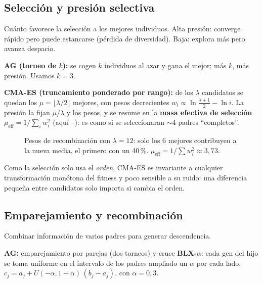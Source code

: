 \documentclass[apuntes]{uc3mmaster}
\begin{document}
\subsection{Selección y presión selectiva}
\begin{definicion}
Cuánto favorece la selección a los mejores individuos. Alta presión: converge rápido pero puede estancarse
(pérdida de diversidad). Baja: explora más pero avanza despacio.
\end{definicion}
\textbf{AG (torneo de $k$):} se cogen $k$ individuos al azar y gana el mejor; más $k$, más presión. Usamos $k=3$.

\textbf{CMA-ES (truncamiento ponderado por rango):} de los $\lambda$ candidatos se quedan los $\mu=\lfloor\lambda/2\rfloor$
mejores, con pesos decrecientes $w_i\propto\ln\frac{\lambda+1}{2}-\ln i$. La presión la fijan $\mu/\lambda$ y los
pesos, y se resume en la \textbf{masa efectiva de selección} $\mu_{\mathrm{eff}}=1/\sum_iw_i^2$ (aquí
\muEffMin--\muEffMax): es como si se seleccionaran $\sim$4 padres ``completos''.

\begin{figure}[h]\centering
{}
\caption{Pesos de recombinación con $\lambda=12$: solo los 6 mejores contribuyen a la nueva media, el primero con un
40\,\%. $\mu_{\mathrm{eff}}=1/\sum w_i^2\approx3{,}73$.}
\end{figure}

\begin{nota}
Como la selección solo usa el \emph{orden}, CMA-ES es invariante a cualquier transformación monótona del fitness y
poco sensible a su ruido: una diferencia pequeña entre candidatos solo importa si cambia el orden.
\end{nota}

\subsection{Emparejamiento y recombinación}
\begin{definicion}
Combinar información de varios padres para generar descendencia.
\end{definicion}
\textbf{AG:} emparejamiento por parejas (dos torneos) y cruce \textbf{BLX-$\alpha$}: cada gen del hijo se toma
uniforme en el intervalo de los padres ampliado un $\alpha$ por cada lado,
$c_j=a_j+U(-\alpha,1+\alpha)\,(b_j-a_j)$, con $\alpha=0{,}3$.
\end{document}
